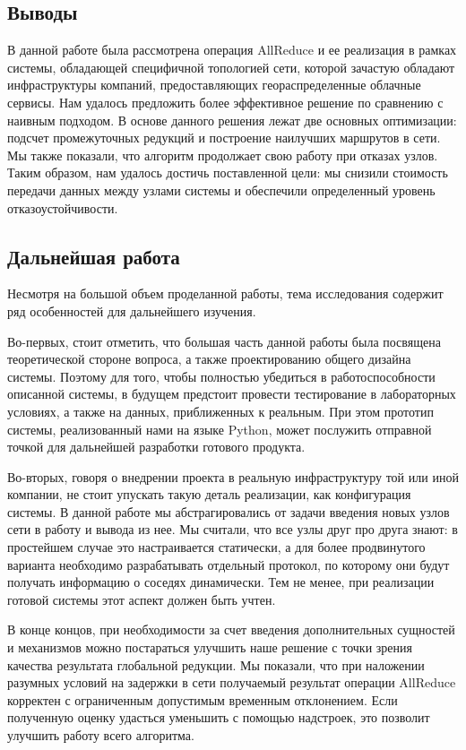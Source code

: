 \documentclass{article}
\theoremstyle{plain}
\theoremstyle{plain}
\theoremstyle{plain}
\theoremstyle{plain}
\theoremstyle{definition}
\theoremstyle{remark}
\theoremstyle{plain}
\begin{document}
\subsection{Выводы}

В данной работе была рассмотрена операция AllReduce и ее реализация в рамках системы, обладающей специфичной топологией сети, которой зачастую обладают инфраструктуры компаний, предоставляющих геораспределенные облачные сервисы. Нам удалось предложить более эффективное решение по сравнению с наивным подходом. В основе данного решения лежат две основных оптимизации: подсчет промежуточных редукций и построение наилучших маршрутов в сети. Мы также показали, что алгоритм продолжает свою работу при отказах узлов. Таким образом, нам удалось достичь поставленной цели: мы снизили стоимость передачи данных между узлами системы и обеспечили определенный уровень отказоустойчивости.

\subsection{Дальнейшая работа}

Несмотря на большой объем проделанной работы, тема исследования содержит ряд особенностей для дальнейшего изучения.

Во-первых, стоит отметить, что большая часть данной работы была посвящена теоретической стороне вопроса, а также проектированию общего дизайна системы. Поэтому для того, чтобы полностью убедиться в работоспособности описанной системы, в будущем предстоит провести тестирование в лабораторных условиях, а также на данных, приближенных к реальным. При этом прототип системы, реализованный нами на языке Python, может послужить отправной точкой для дальнейшей разработки готового продукта.

Во-вторых, говоря о внедрении проекта в реальную инфраструктуру той или иной компании, не стоит упускать такую деталь реализации, как конфигурация системы. В данной работе мы абстрагировались от задачи введения новых узлов сети в работу и вывода из нее. Мы считали, что все узлы друг про друга знают: в простейшем случае это настраивается статически, а для более продвинутого варианта необходимо разрабатывать отдельный протокол, по которому они будут получать информацию о соседях динамически. Тем не менее, при реализации готовой системы этот аспект должен быть учтен.

В конце концов, при необходимости за счет введения дополнительных сущностей и механизмов можно постараться улучшить наше решение с точки зрения качества результата глобальной редукции. Мы показали, что при наложении разумных условий на задержки в сети получаемый результат операции AllReduce корректен с ограниченным допустимым временным отклонением. Если полученную оценку удасться уменьшить с помощью надстроек, это позволит улучшить работу всего алгоритма.
\end{document}
